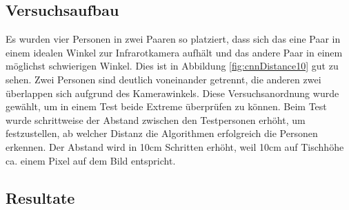\subsection{Versuchsaufbau}

Es wurden vier Personen in zwei Paaren so platziert, dass sich das eine Paar in einem idealen Winkel zur Infrarotkamera aufhält und das andere Paar in einem möglichst schwierigen Winkel. Dies ist in Abbildung \ref{fig:cnnDistance10} gut zu sehen. Zwei Personen sind deutlich voneinander getrennt, die anderen zwei überlappen sich aufgrund des Kamerawinkels. Diese Versuchsanordnung wurde gewählt, um in einem Test beide Extreme überprüfen zu können. 
Beim Test wurde schrittweise der Abstand zwischen den Testpersonen erhöht, um festzustellen, ab welcher Distanz die Algorithmen erfolgreich die Personen erkennen. Der Abstand wird in 10cm Schritten erhöht, weil 10cm auf Tischhöhe ca. einem Pixel auf dem Bild entspricht.

\subsection{Resultate}

